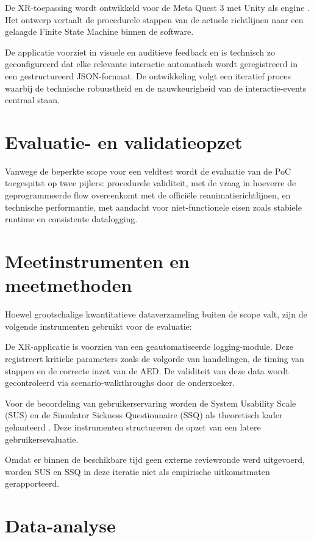 De XR-toepassing wordt ontwikkeld voor de Meta Quest 3 met Unity als engine \autocite{UnityDocs}. Het ontwerp vertaalt de procedurele stappen van de actuele richtlijnen naar een gelaagde Finite State Machine binnen de software. 

De applicatie voorziet in visuele en auditieve feedback en is technisch zo geconfigureerd dat elke relevante interactie automatisch wordt geregistreerd in een gestructureerd JSON-formaat. De ontwikkeling volgt een iteratief proces waarbij de technische robuustheid en de nauwkeurigheid van de interactie-events centraal staan.

\section{Evaluatie- en validatieopzet}

Vanwege de beperkte scope voor een veldtest wordt de evaluatie van de PoC toegespitst op twee pijlers: procedurele validiteit, met de vraag in hoeverre de geprogrammeerde flow overeenkomt met de officiële reanimatierichtlijnen, en technische performantie, met aandacht voor niet-functionele eisen zoals stabiele runtime en consistente datalogging.

\section{Meetinstrumenten en meetmethoden}

Hoewel grootschalige kwantitatieve dataverzameling buiten de scope valt, zijn de volgende instrumenten gebruikt voor de evaluatie:

De XR-applicatie is voorzien van een geautomatiseerde logging-module. Deze registreert kritieke parameters zoals de volgorde van handelingen, de timing van stappen en de correcte inzet van de AED. De validiteit van deze data wordt gecontroleerd via scenario-walkthroughs door de onderzoeker.

Voor de beoordeling van gebruikerservaring worden de System Usability Scale (SUS) en de Simulator Sickness Questionnaire (SSQ) als theoretisch kader gehanteerd \autocite{SUSBrooke1996, Kennedy1993SSQ}. Deze instrumenten structureren de opzet van een latere gebruikersevaluatie.

Omdat er binnen de beschikbare tijd geen externe reviewronde werd uitgevoerd, worden SUS en SSQ in deze iteratie niet als empirische uitkomstmaten gerapporteerd.

\section{Data-analyse}

